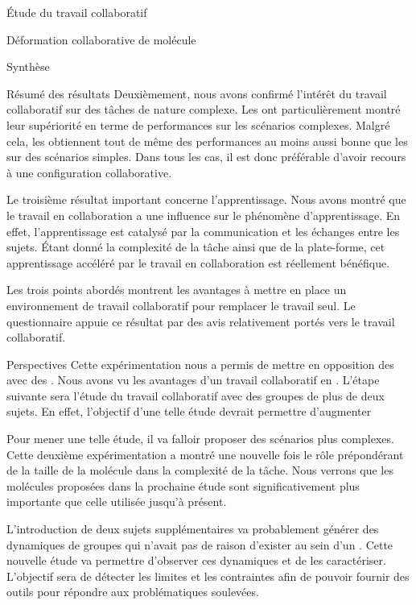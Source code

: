 \documentclass[myfrancais]{mythesis}
\begin{document}
\begin{mypart}{Étude du travail collaboratif}
\begin{mychapter}{Déformation collaborative de molécule}
\begin{mysection}{Synthèse}
\begin{mysubsection}{Résumé des résultats}
					Deuxièmement, nous avons confirmé l'intérêt du travail collaboratif sur des tâches de nature complexe.
					Les  ont particulièrement montré leur supériorité en terme de performances sur les scénarios complexes.
					Malgré cela, les  obtiennent tout de même des performances au moins aussi bonne que les  sur des scénarios simples.
					Dans tous les cas, il est donc préférable d'avoir recours à une configuration collaborative.

					Le troisième résultat important concerne l'apprentissage.
					Nous avons montré que le travail en collaboration a une influence sur le phénomène d'apprentissage.
					En effet, l'apprentissage est catalysé par la communication et les échanges entre les sujets.
					Étant donné la complexité de la tâche ainsi que de la plate-forme, cet apprentissage accéléré par le travail en collaboration est réellement bénéfique.

					Les trois points abordés montrent les avantages à mettre en place un environnement de travail collaboratif pour remplacer le travail seul.
					Le questionnaire appuie ce résultat par des avis relativement portés vers le travail collaboratif.
				\end{mysubsection}
				\begin{mysubsection}{Perspectives}
					Cette expérimentation nous a permis de mettre en opposition des  avec des .
					Nous avons vu les avantages d'un travail collaboratif en .
					L'étape suivante sera l'étude du travail collaboratif avec des groupes de plus de deux sujets.
					En effet, l'objectif d'une telle étude devrait permettre d'augmenter 

					Pour mener une telle étude, il va falloir proposer des scénarios plus complexes.
					Cette deuxième expérimentation a montré une nouvelle fois le rôle prépondérant de la taille de la molécule dans la complexité de la tâche.
					Nous verrons que les molécules proposées dans la prochaine étude sont significativement plus importante que celle utilisée jusqu'à présent.

					L'introduction de deux sujets supplémentaires va probablement générer des dynamiques de groupes qui n'avait pas de raison d'exister au sein d'un .
					Cette nouvelle étude va permettre d'observer ces dynamiques et de les caractériser.
					L'objectif sera de détecter les limites et les contraintes afin de pouvoir fournir des outils pour répondre aux problématiques soulevées.


\end{mysubsection}
\end{mysection}
\end{mychapter}
\end{mypart}
\end{document}
